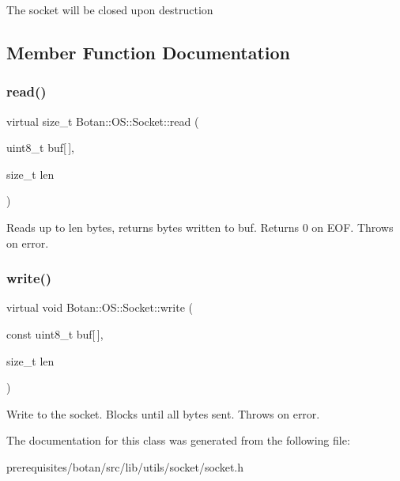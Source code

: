 The socket will be closed upon destruction 

\subsection{Member Function Documentation}
\mbox{\label{class_botan_1_1_o_s_1_1_socket_aa6b883f7ee070a0257ccbf1a7b27ad16}} 
\subsubsection{\texorpdfstring{read()}{read()}}
{\footnotesize\ttfamily virtual size\+\_\+t Botan\+::\+O\+S\+::\+Socket\+::read (\begin{DoxyParamCaption}\item[{uint8\+\_\+t}]{buf\mbox{[}$\,$\mbox{]},  }\item[{size\+\_\+t}]{len }\end{DoxyParamCaption})\hspace{0.3cm}{\ttfamily [pure virtual]}}

Reads up to len bytes, returns bytes written to buf. Returns 0 on E\+OF. Throws on error. \mbox{\label{class_botan_1_1_o_s_1_1_socket_ae342393ce22c475f8197e14c45eee73b}} 
\subsubsection{\texorpdfstring{write()}{write()}}
{\footnotesize\ttfamily virtual void Botan\+::\+O\+S\+::\+Socket\+::write (\begin{DoxyParamCaption}\item[{const uint8\+\_\+t}]{buf\mbox{[}$\,$\mbox{]},  }\item[{size\+\_\+t}]{len }\end{DoxyParamCaption})\hspace{0.3cm}{\ttfamily [pure virtual]}}

Write to the socket. Blocks until all bytes sent. Throws on error. 

The documentation for this class was generated from the following file\+:\begin{DoxyCompactItemize}
\item 
prerequisites/botan/src/lib/utils/socket/socket.\+h\end{DoxyCompactItemize}
